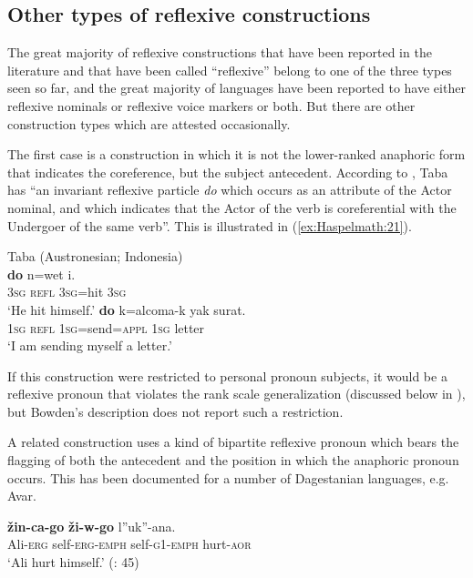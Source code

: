 \documentclass[output=paper]{langscibook}
\begin{document}
\subsection{Other types of reflexive constructions}\label{sec:Haspelmath:5.4}

The great majority of reflexive constructions that have been reported in the literature and that have been called “reflexive” belong to one of the three types seen so far, and the great majority of languages have been reported to have either reflexive nominals or reflexive voice markers or both. But there are other construction types which are attested occasionally. 

The first case is a construction in which it is not the lower-ranked anaphoric form that indicates the coreference, but the subject antecedent. According to \citet[166]{Bowden2001}, Taba has “an invariant reflexive particle \textit{do} which occurs as an attribute of the Actor nominal, and which indicates that the Actor of the verb is coreferential with the Undergoer of the same verb”. This is illustrated in (\ref{ex:Haspelmath:21}).

\ea  Taba (Austronesian; Indonesia)\label{ex:Haspelmath:21}\\
    \ea  
     \textbf{{do}}  {n=wet}  {i.}\\
      \textsc{3sg}  \textsc{refl}  \textsc{3sg}=hit  \textsc{3sg}\\
    \glt        ‘He hit himself.’
    \ex 
      \textbf{{do}}  {k=alcoma-k}    {yak}  {surat.}\\
      \textsc{1sg}  \textsc{refl}  {\textsc{1sg}=send=\textsc{appl}}  \textsc{1sg}  {letter}\\
     \glt   ‘I am sending myself a letter.’
     \z 
\z 

If this construction were restricted to personal pronoun subjects, it would be a reflexive pronoun that violates the rank scale generalization (discussed below in ), but Bowden’s description does not report such a restriction.

  A related construction uses a kind of bipartite reflexive pronoun which bears the flagging of both the antecedent and the position in which the anaphoric pronoun occurs. This has been documented for a number of Dagestanian languages, e.g. Avar.

\ea 
    \label{ex:Haspelmath:22}
      \textbf{{žin-ca-go}}  \textbf{{ži-w-go}}  {l”uk”-ana.}\\
      Ali-\textsc{erg}  self-\textsc{erg-emph}  self-\textsc{g1}{}-\textsc{emph}  hurt-\textsc{aor}  \\
    \glt  ‘Ali hurt himself.’ (\citealt{Testelec1998}: 45)
\z
\end{document}
